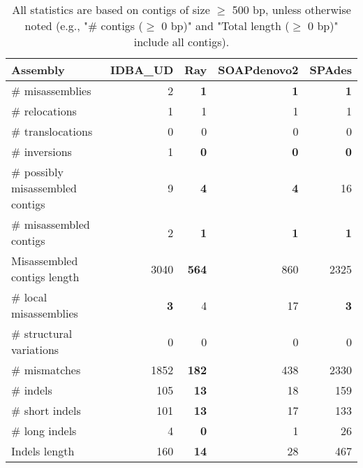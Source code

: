 \documentclass[12pt,a4paper]{article}
\begin{document}
\begin{table}[ht]
\begin{center}
\caption{All statistics are based on contigs of size $\geq$ 500 bp, unless otherwise noted (e.g., "\# contigs ($\geq$ 0 bp)" and "Total length ($\geq$ 0 bp)" include all contigs).}
\begin{tabular}{|l*{4}{|r}|}
\hline
Assembly & IDBA\_UD & Ray & SOAPdenovo2 & SPAdes \\ \hline
\# misassemblies & 2 & {\bf 1} & {\bf 1} & {\bf 1} \\ \hline
\hspace{5mm}\# relocations & 1 & 1 & 1 & 1 \\ \hline
\hspace{5mm}\# translocations & 0 & 0 & 0 & 0 \\ \hline
\hspace{5mm}\# inversions & 1 & {\bf 0} & {\bf 0} & {\bf 0} \\ \hline
\# possibly misassembled contigs & 9 & {\bf 4} & {\bf 4} & 16 \\ \hline
\# misassembled contigs & 2 & {\bf 1} & {\bf 1} & {\bf 1} \\ \hline
Misassembled contigs length & 3040 & {\bf 564} & 860 & 2325 \\ \hline
\# local misassemblies & {\bf 3} & 4 & 17 & {\bf 3} \\ \hline
\# structural variations & 0 & 0 & 0 & 0 \\ \hline
\# mismatches & 1852 & {\bf 182} & 438 & 2330 \\ \hline
\# indels & 105 & {\bf 13} & 18 & 159 \\ \hline
\hspace{5mm}\# short indels & 101 & {\bf 13} & 17 & 133 \\ \hline
\hspace{5mm}\# long indels & 4 & {\bf 0} & 1 & 26 \\ \hline
Indels length & 160 & {\bf 14} & 28 & 467 \\ \hline
\end{tabular}
\end{center}
\end{table}
\end{document}
